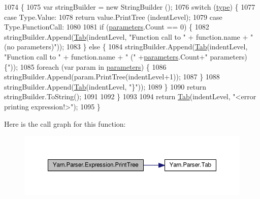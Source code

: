 \begin{DoxyCode}
1074             \{
1075                 var stringBuilder = \textcolor{keyword}{new} StringBuilder ();
1076                 \textcolor{keywordflow}{switch} (\hyperlink{a00094_ad55c92df835006328bc2a79a8f91efb9}{type}) \{
1077                 \textcolor{keywordflow}{case} Type.Value:
1078                     \textcolor{keywordflow}{return} value.PrintTree (indentLevel);
1079                 \textcolor{keywordflow}{case} Type.FunctionCall:
1080 
1081                     \textcolor{keywordflow}{if} (\hyperlink{a00094_a7b21380bead8ae08b2cfc6594edab32c}{parameters}.Count == 0) \{
1082                         stringBuilder.Append(\hyperlink{a00139_aa8fa36b46de12a1c561d77b99c4b9ae3}{Tab}(indentLevel, \textcolor{stringliteral}{"Function call to "} + \textcolor{keyword}{function}.name + \textcolor{stringliteral}{"
       (no parameters)"}));
1083                     \} \textcolor{keywordflow}{else} \{
1084                         stringBuilder.Append(\hyperlink{a00139_aa8fa36b46de12a1c561d77b99c4b9ae3}{Tab}(indentLevel, \textcolor{stringliteral}{"Function call to "} + \textcolor{keyword}{function}.name + \textcolor{stringliteral}{" ("}
       +\hyperlink{a00094_a7b21380bead8ae08b2cfc6594edab32c}{parameters}.Count+\textcolor{stringliteral}{" parameters) \{"}));
1085                         \textcolor{keywordflow}{foreach} (var param \textcolor{keywordflow}{in} \hyperlink{a00094_a7b21380bead8ae08b2cfc6594edab32c}{parameters}) \{
1086                             stringBuilder.Append(param.PrintTree(indentLevel+1));
1087                         \}
1088                         stringBuilder.Append(\hyperlink{a00139_aa8fa36b46de12a1c561d77b99c4b9ae3}{Tab}(indentLevel, \textcolor{stringliteral}{"\}"}));
1089                     \}
1090                     \textcolor{keywordflow}{return} stringBuilder.ToString();
1091 
1092                 \}
1093 
1094                 \textcolor{keywordflow}{return} \hyperlink{a00139_aa8fa36b46de12a1c561d77b99c4b9ae3}{Tab}(indentLevel, \textcolor{stringliteral}{"<error printing expression!>"});
1095             \}
\end{DoxyCode}


Here is the call graph for this function\-:
\nopagebreak
\begin{figure}[H]
\begin{center}
\leavevmode
\includegraphics[width=350pt]{a00094_a509ba6d93218203bae56a5a7a82e8261_cgraph}
\end{center}
\end{figure}


